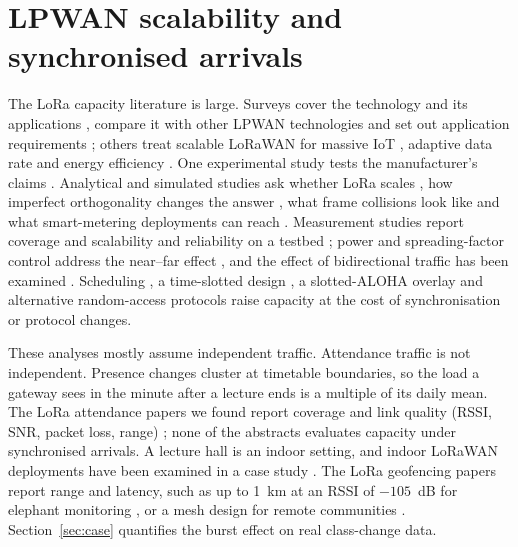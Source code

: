 \documentclass[preprint,12pt]{elsarticle}
\begin{document}
\section{LPWAN scalability and synchronised arrivals}\label{sec:lpwan}
The LoRa capacity literature is large. Surveys cover the technology and its applications \cite{haxhibeqiri2018survey,sinha2017survey}, compare it with other LPWAN technologies \cite{mekki2019comparative} and set out application requirements \cite{chaudhari2020lpwan}; others treat scalable LoRaWAN for massive IoT \cite{jouhari2023survey}, adaptive data rate \cite{kufakunesu2020survey} and energy efficiency \cite{cheikh2022multi,banti2022lorawan}. One experimental study tests the manufacturer's claims \cite{liando2019known}. Analytical and simulated studies ask whether LoRa scales \cite{bor2016scale,georgiou2017scale,adelantado2017limits,haxhibeqiri2017sim}, how imperfect orthogonality changes the answer \cite{mahmood2019scalability,croce2018impact}, what frame collisions look like \cite{rahmadhani2018collide} and what smart-metering deployments can reach \cite{varsier2017capacity}. Measurement studies report coverage and scalability \cite{petjjrvi2017performance,sancheziborra2018performance} and reliability on a testbed \cite{cattani2017experimental}; power and spreading-factor control address the near--far effect \cite{reynders2017power}, and the effect of bidirectional traffic has been examined \cite{pop2017does}. Scheduling \cite{reynders2018scheduling,haxhibeqiri2019overhead}, a time-slotted design \cite{zorbas2020lora}, a slotted-ALOHA overlay \cite{polonelli2019slotted} and alternative random-access protocols \cite{beltramelli2021lora} raise capacity at the cost of synchronisation or protocol changes.

These analyses mostly assume independent traffic. Attendance traffic is not independent. Presence changes cluster at timetable boundaries, so the load a gateway sees in the minute after a lecture ends is a multiple of its daily mean. The LoRa attendance papers we found report coverage and link quality (RSSI, SNR, packet loss, range) \cite{noprianto2023application,khurshid2025fusion}; none of the abstracts evaluates capacity under synchronised arrivals. A lecture hall is an indoor setting, and indoor LoRaWAN deployments have been examined in a case study \cite{neumann2016indoor}. The LoRa geofencing papers report range and latency, such as up to 1~km at an RSSI of $-105$~dB for elephant monitoring \cite{andika2026lora}, or a mesh design for remote communities \cite{ahmed2024scalable}. Section~\ref{sec:case} quantifies the burst effect on real class-change data.
\end{document}

